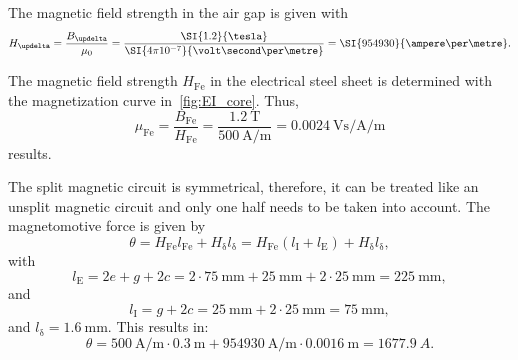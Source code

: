 \begin{solutionblock}
    The magnetic field strength in the air gap is given with
    $$
        H_{\updelta} = \frac{B_{\updelta}}{\mu_{\mathrm{0}}} = \frac{\SI{1.2}{\tesla}}{\SI{4\pi 10^{-7}}{\volt\second\per\metre}} = \SI{954930}{\ampere\per\metre}.
    $$

    The magnetic field strength $H_{\mathrm{Fe}}$ in the electrical steel sheet is determined with the magnetization curve in~\autoref{fig:EI_core}. Thus,
    $$
        \mu_{\mathrm{Fe}} = \frac{B_{\mathrm{Fe}}}{H_{\mathrm{Fe}}} = \frac{\SI{1.2}{\tesla}}{\SI{500}{\ampere\per\metre}} = \SI{0.0024}{\volt\second\per\ampere\per\metre}
    $$
    results.
\end{solutionblock}






\begin{solutionblock}
    The split magnetic circuit is symmetrical, therefore, it can be treated like an unsplit magnetic circuit and only one half needs to be taken into account. The magnetomotive force is given by
    $$
        \theta = H_{\mathrm{Fe}} l_{\mathrm{Fe}} + H_{\updelta} l_{\updelta} = H_{\mathrm{Fe}} \left(l_{\mathrm{I}} + l_{\mathrm{E}}\right) + H_{\updelta} l_{\updelta},
    $$
    with
    $$
        l_{\mathrm{E}} = 2e+g+2c = 2\cdot \SI{75}{\milli\metre} + \SI{25}{\milli\metre} + 2\cdot \SI{25}{\milli\metre} = \SI{225}{\milli\metre},
    $$
    and
    $$
        l_{\mathrm{I}} = g + 2c = \SI{25}{\milli\metre} + 2\cdot \SI{25}{\milli\metre} = \SI{75}{\milli\metre},
    $$
    and $l_{\updelta} = \SI{1.6}{\milli\metre}$. This results in:
    $$
        \theta = \SI{500}{\ampere\per\metre} \cdot \SI{0.3}{\metre} + \SI{954930}{\ampere\per\metre} \cdot \SI{0.0016}{\metre} = \SI{1677.9}{A}.
    $$



\end{solutionblock}


